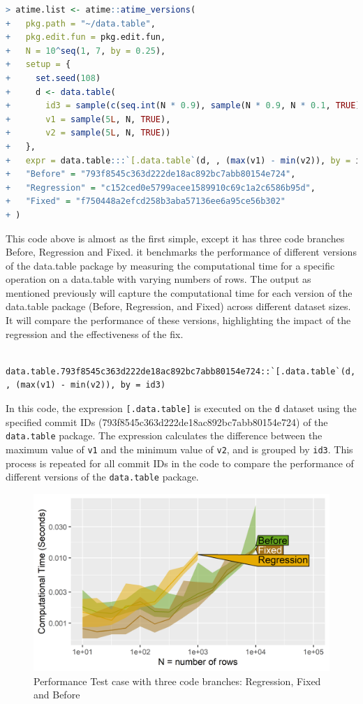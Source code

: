 \begin{lstlisting}[language=R]
> atime.list <- atime::atime_versions(
+   pkg.path = "~/data.table",
+   pkg.edit.fun = pkg.edit.fun,
+   N = 10^seq(1, 7, by = 0.25),
+   setup = { 
+     set.seed(108)
+     d <- data.table(
+       id3 = sample(c(seq.int(N * 0.9), sample(N * 0.9, N * 0.1, TRUE))),
+       v1 = sample(5L, N, TRUE),
+       v2 = sample(5L, N, TRUE))
+   },
+   expr = data.table:::`[.data.table`(d, , (max(v1) - min(v2)), by = id3),
+   "Before" = "793f8545c363d222de18ac892bc7abb80154e724",
+   "Regression" = "c152ced0e5799acee1589910c69c1a2c6586b95d",
+   "Fixed" = "f750448a2efcd258b3aba57136ee6a95ce56b302"
+ )
\end{lstlisting}

\noindent This code above is almost as the first simple, except it has three code branches Before, Regression and Fixed. it benchmarks the performance of different versions of the data.table package by measuring the computational time for a specific operation on a data.table with varying numbers of rows.
The output as mentioned previously will capture the computational time for each version of the data.table package (Before, Regression, and Fixed) across different dataset sizes. It will compare the performance of these versions, highlighting the impact of the regression and the effectiveness of the fix. \\


    \begin{verbatim}
    data.table.793f8545c363d222de18ac892bc7abb80154e724::`[.data.table`(d, , (max(v1) - min(v2)), by = id3)  
    \end{verbatim}
    
\vspace{0.1in}
\noindent In this code, the expression \texttt{[.data.table]} is executed on the \texttt{d} dataset using the specified commit IDs (793f8545c363d222de18ac892bc7abb80154e724) of the \texttt{data.table} package. The expression calculates the difference between the maximum value of \texttt{v1} and the minimum value of \texttt{v2}, and is grouped by \texttt{id3}. This process is repeated for all commit IDs in the code to compare the performance of different versions of the \texttt{data.table} package.\\

\begin{figure}[H]
    \centering
    \includegraphics[width=0.7\linewidth]{figures/atime.list.4200.png}
    \caption{Performance Test case with three code branches: Regression, Fixed and Before}
    \label{fig:label4}
\end{figure}

